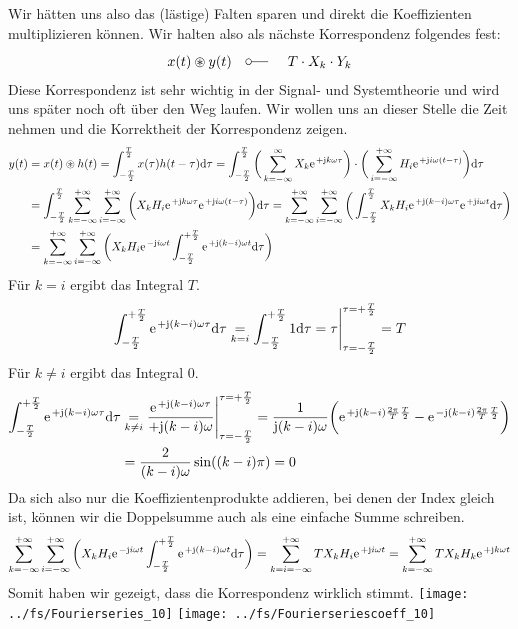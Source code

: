\documentclass[11pt,a4paper,DIV=12]{scrartcl}
\newcommand{\diff}{\mathrm{d}}
\begin{document}
Wir hätten uns also das (lästige) Falten sparen und direkt die Koeffizienten multiplizieren können. Wir halten also als nächste Korrespondenz folgendes fest:
\begin{align}
	x(t)\circledast y(t)\quad\fourier\quad T\cdot X_k\cdot Y_k
\end{align}
Diese Korrespondenz ist sehr wichtig in der Signal- und Systemtheorie und wird uns später noch oft über den Weg laufen.
Wir wollen uns an dieser Stelle die Zeit nehmen und die Korrektheit der Korrespondenz zeigen.
\begin{align}
	y(t)&=x(t)\circledast h(t)=\int_{-\frac{T}{2}}^{\frac{T}{2}}x(\tau)h(t-\tau)\diff \tau=\int_{-\frac{T}{2}}^{\frac{T}{2}}\bigg (\sum_{k=-\infty}^{\infty}X_k\e^{+\im k \omega \tau}\bigg )\cdot \bigg (\sum_{i=-\infty}^{+\infty}H_i\e^{+\im i \omega (t-\tau)}\bigg )\diff \tau\nonumber \\
	&=\int_{-\frac{T}{2}}^{\frac{T}{2}}\sum_{k=-\infty}^{+\infty}\sum_{i=-\infty}^{+\infty}\bigg (X_kH_i\e^{+\im k \omega \tau}\e^{+\im i \omega (t-\tau)}\bigg )\diff \tau=\sum_{k=-\infty}^{+\infty}\sum_{i=-\infty}^{+\infty}\bigg (\int_{-\frac{T}{2}}^{\frac{T}{2}}X_kH_i\e^{+\im (k-i) \omega \tau}\e^{+\im i \omega t}\diff \tau\bigg )\nonumber \\
	&=\sum_{k=-\infty}^{+\infty}\sum_{i=-\infty}^{+\infty}\bigg (X_kH_i\e^{-\im i \omega t}\int_{-\frac{T}{2}}^{+\frac{T}{2}}\e^{+\im (k-i)\omega t}\diff \tau \bigg )
\end{align}
Für $k=i$ ergibt das Integral $T$.
\begin{align}
	\int_{-\frac{T}{2}}^{+\frac{T}{2}}\e^{+\im (k-i)\omega \tau}\diff \tau \underset{k=i}{=}\int_{-\frac{T}{2}}^{+\frac{T}{2}}1\diff \tau =\tau \Bigg |_{\tau=-\frac{T}{2}}^{\tau=+\frac{T}{2}}=T
\end{align}
Für $k\neq i$ ergibt das Integral $0$.
\begin{align}
	\int_{-\frac{T}{2}}^{+\frac{T}{2}}\e^{+\im (k-i)\omega \tau}\diff \tau &\underset{k\neq i}{=}\frac{\e^{+\im (k-i)\omega \tau}}{+\im (k-i)\omega}\Bigg |_{\tau=-\frac{T}{2}}^{\tau=+\frac{T}{2}}=\frac{1}{\im (k-i)\omega }\bigg (\e^{+\im (k-i)\frac{2\pi}{T}\frac{T}{2}}-\e^{-\im (k-i)\frac{2\pi}{T}\frac{T}{2}}\bigg )\nonumber \\
	&=\frac{2}{ (k-i)\omega}\sin((k-i)\pi)=0
\end{align}
Da sich also nur die Koeffizientenprodukte addieren, bei denen der Index gleich ist, können wir die Doppelsumme auch als eine einfache Summe schreiben.
\begin{align}
	\sum_{k=-\infty}^{+\infty}\sum_{i=-\infty}^{+\infty}\bigg (X_kH_i\e^{-\im i \omega t}\int_{-\frac{T}{2}}^{+\frac{T}{2}}\e^{+\im (k-i)\omega t}\diff \tau \bigg )=\sum_{k=i=-\infty}^{+\infty}TX_kH_i\e^{+\im i\omega t}=\sum_{k=-\infty}^{+\infty}TX_kH_k\e^{+\im k \omega t}
\end{align}
Somit haben wir gezeigt, dass die Korrespondenz wirklich stimmt.
\newpage
\texttt{[image: ../fs/Fourierseries\_10]}
\texttt{[image: ../fs/Fourierseriescoeff\_10]}
\newpage
\end{document}
